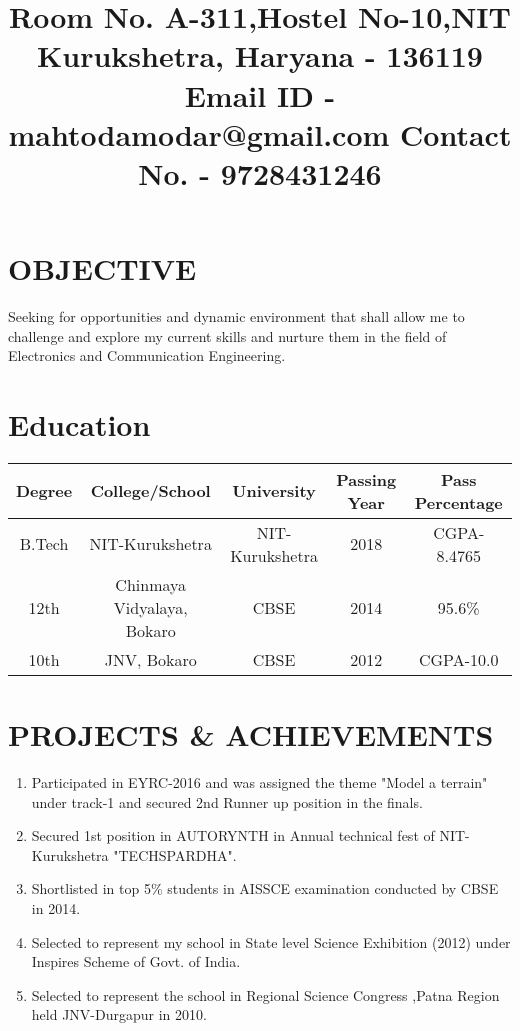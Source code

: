 \documentclass[11pt,a4paper,sans]{moderncv}
\title{   \newline Room No.  A-311,\newline Hostel No-10,\newline NIT Kurukshetra, \newline Haryana - 136119 \newline Email ID - mahtodamodar@gmail.com \newline Contact No. - 9728431246}
\begin{document}
\makecvtitle
\section{OBJECTIVE}
Seeking for opportunities and dynamic environment that shall allow me to challenge and explore my current skills and nurture them in the field of Electronics and Communication Engineering.
\section{Education}
\begin{center}
\begin{tabular}{ |c|c|c|c|c| } 
\hline
Degree & College/School & University & Passing Year & Pass Percentage \\
\hline
\multirow {1}{4em}{B.Tech} & { NIT-Kurukshetra } & { NIT-Kurukshetra } & {2018} & {CGPA-8.4765} \\ 
\hline
\multirow {1}{4em}{12th} & { Chinmaya Vidyalaya, Bokaro } & { CBSE } & {2014} & {95.6\%}\\
\hline
\multirow {1}{4em}{10th} & { JNV, Bokaro } & { CBSE } & {2012} & {CGPA-10.0}\\
\hline
\end{tabular}
\end{center}
\section{PROJECTS \& ACHIEVEMENTS}
\begin{enumerate}
\item Participated in EYRC-2016 and was assigned the theme "Model a terrain" under track-1 and secured 2nd Runner up position in the finals.
\item Secured 1st position in AUTORYNTH in Annual technical fest of NIT-Kurukshetra "TECHSPARDHA".
\item Shortlisted in top 5\% students in AISSCE examination conducted by CBSE in 2014.
\item Selected to represent my school in State level Science Exhibition (2012) under Inspires Scheme of Govt. of India.
\item Selected to represent the school in Regional Science Congress ,Patna Region held JNV-Durgapur in 2010.  
\end{enumerate}

\clearpage
\end{document}
